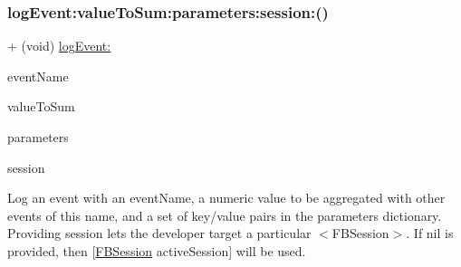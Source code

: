 \subsubsection{\texorpdfstring{log\+Event\+:value\+To\+Sum\+:parameters\+:session\+:()}{logEvent:valueToSum:parameters:session:()}\hspace{0.1cm}{\footnotesize\ttfamily [4/5]}}
{\footnotesize\ttfamily + (void) \hyperlink{interfaceFBAppEvents_a816373dd50bcf7381bf8194758ef8441}{log\+Event\+:} \begin{DoxyParamCaption}\item[{(N\+S\+String $\ast$)}]{event\+Name }\item[{valueToSum:(N\+S\+Number $\ast$)}]{value\+To\+Sum }\item[{parameters:(N\+S\+Dictionary $\ast$)}]{parameters }\item[{session:(\hyperlink{interfaceFBSession}{F\+B\+Session} $\ast$)}]{session }\end{DoxyParamCaption}}

Log an event with an event\+Name, a numeric value to be aggregated with other events of this name, and a set of key/value pairs in the parameters dictionary. Providing session lets the developer target a particular $<$\+F\+B\+Session$>$. If nil is provided, then {\ttfamily \mbox{[}\hyperlink{interfaceFBSession}{F\+B\+Session} active\+Session\mbox{]}} will be used.


